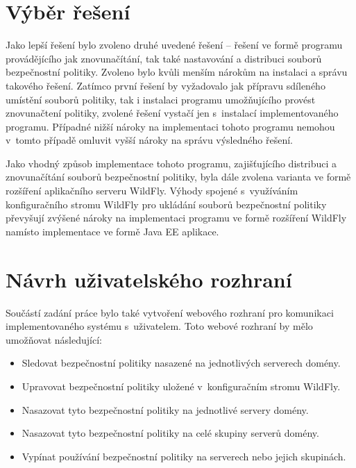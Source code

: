 \section{Výběr řešení} \label{vyberReseni}

Jako lepší řešení bylo zvoleno druhé uvedené řešení -- řešení ve formě programu provádějícího jak znovunačítání, tak také nastavování a distribuci souborů bezpečnostní politiky.
Zvoleno bylo kvůli menším nárokům na instalaci a správu takového řešení. Zatímco první řešení by vyžadovalo jak přípravu sdíleného umístění souborů politiky, tak i instalaci programu umožňujícího provést znovunačtení politiky, zvolené řešení vystačí jen s~instalací implementovaného programu.
Případné nižší nároky na implementaci tohoto programu nemohou v~tomto případě omluvit vyšší nároky na správu výsledného řešení.

Jako vhodný způsob implementace tohoto programu, zajišťujícího distribuci a znovunačítání souborů bezpečnostní politiky, byla dále zvolena varianta ve formě rozšíření aplikačního serveru WildFly.
Výhody spojené s~využíváním konfiguračního stromu WildFly pro ukládání souborů bezpečnostní politiky převyšují zvýšené nároky na implementaci programu ve formě rozšíření WildFly namísto implementace ve formě Java EE aplikace.

\section{Návrh uživatelského rozhraní} \label{navrhGUI}

Součástí zadání práce bylo také vytvoření webového rozhraní pro komunikaci implementovaného systému s~uživatelem.
Toto webové rozhraní by mělo umožňovat následující:

\begin{itemize}
  \item Sledovat bezpečnostní politiky nasazené na jednotlivých serverech domény.
  \item Upravovat bezpečnostní politiky uložené v~konfiguračním stromu WildFly.
  \item Nasazovat tyto bezpečnostní politiky na jednotlivé servery domény.
  \item Nasazovat tyto bezpečnostní politiky na celé skupiny serverů domény.
  \item Vypínat používání bezpečnostní politiky na serverech nebo jejich skupinách.
\end{itemize}

